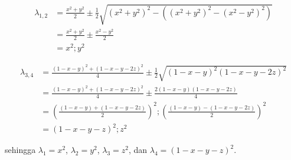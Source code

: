 \begin{enumerate}
	\begin{equation}
		\begin{aligned}
			\lambda_{1,2}
			&=\frac{x^2+y^2}{2}\pm\frac{1}{2}\sqrt{(x^2+y^2)^2-((x^2+y^2)^2-(x^2-y^2)^2)}\\
			&=\frac{x^2+y^2}{2}\pm\frac{x^2-y^2}{2}\\
			&=x^2; y^2
		\end{aligned}
	\end{equation}
	
	\begin{equation}
		\begin{aligned}
			\lambda_{3,4}
			&=\frac{(1-x-y)^2+(1-x-y-2z)^2}{4}\pm\frac{1}{2}\sqrt{(1-x-y)^2(1-x-y-2z)^2}\\
			&=\frac{(1-x-y)^2+(1-x-y-2z)^2}{4}\pm\frac{2{(1-x-y)(1-x-y-2z)}}{4}\\
			&=(\frac{(1-x-y)+(1-x-y-2z)}{2})^2; (\frac{(1-x-y)-(1-x-y-2z)}{2})^2\\
			&=(1-x-y-z)^2; z^2
		\end{aligned}
	\end{equation}
	
	sehingga $\lambda_1=x^2$, $\lambda_2=y^2$, $\lambda_3=z^2$, dan $\lambda_4=(1-x-y-z)^2$.
\end{enumerate}



